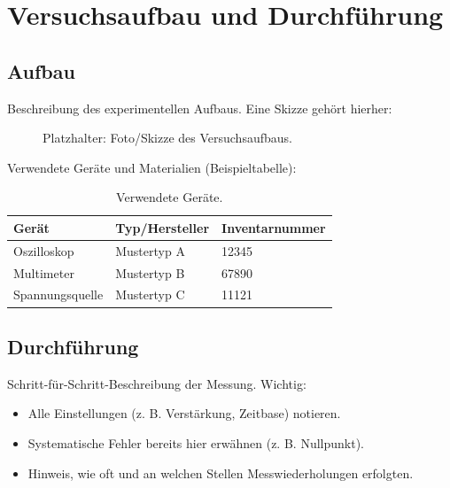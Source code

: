 \section{Versuchsaufbau und Durchführung}
\label{sec:aufbau}

\subsection{Aufbau}
Beschreibung des experimentellen Aufbaus. Eine Skizze gehört hierher:

\begin{figure}[H]
  \centering
  \caption{Platzhalter: Foto/Skizze des Versuchsaufbaus.}
  \label{fig:aufbau}
\end{figure}

Verwendete Geräte und Materialien (Beispieltabelle):
\begin{table}[H]
  \centering
  \caption{Verwendete Geräte.}
  \label{tab:geraete}
  \begin{tabular}{lll}
    \toprule
    Gerät & Typ/Hersteller & Inventarnummer \\
    \midrule
    Oszilloskop & Mustertyp A & 12345 \\
    Multimeter & Mustertyp B   & 67890 \\
    Spannungsquelle & Mustertyp C & 11121 \\
    \bottomrule
  \end{tabular}
\end{table}

\subsection{Durchführung}
Schritt-für-Schritt-Beschreibung der Messung. Wichtig:
\begin{itemize}
  \item Alle Einstellungen (z. B. Verstärkung, Zeitbase) notieren.
  \item Systematische Fehler bereits hier erwähnen (z. B. Nullpunkt).
  \item Hinweis, wie oft und an welchen Stellen Messwiederholungen erfolgten.
\end{itemize}

